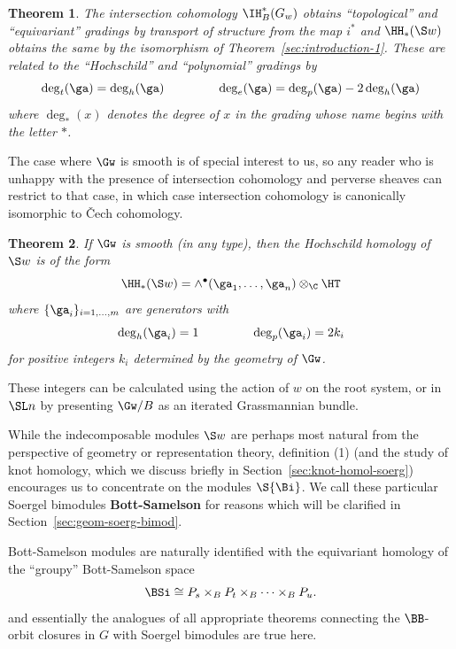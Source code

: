 \documentclass[12pt]{wart}
\newtheorem{thm}{Theorem}[section]
\theoremstyle{remark}
\begin{document}
\begin{thm}\label{grading-match}
  The intersection cohomology $\IH^*_B(G_w)$ obtains ``topological''
  and ``equivariant'' gradings by transport of structure from the map
  $i^*$ and $\HH_*(\S w)$ obtains the same by the isomorphism of
  Theorem~\ref{sec:introduction-1}.  These are related to the
  ``Hochschild'' and ``polynomial'' gradings by
  \begin{equation*}
    \deg_t(\ga)=\deg_h(\ga) \hspace{15mm} \deg_e(\ga)=\deg_p(\ga)-2\deg_h(\ga)
  \end{equation*}
  where $\deg_*(x)$ denotes the degree of $x$ in the grading whose name begins with the letter $*$.
\end{thm}

The case where $\Gw$ is smooth is of special interest to us, so any
reader who is unhappy with the presence of intersection cohomology and
perverse sheaves can restrict to that case, in which case intersection
cohomology is canonically isomorphic to \v{C}ech cohomology.

\begin{thm}\label{ind-HH}
  If $\Gw$ is smooth (in any type), then the Hochschild homology of
  $\S w$ is of the form
  \begin{equation*}
    \HH_*(\S w)=\land^\bullet(\ga_1,\ldots, \ga_n)\otimes_{\C}\HT
  \end{equation*}
  where $\{\ga_i\}_{i=1,\ldots,m}$ are generators with
  \begin{equation*}
    \deg_h(\ga_i)=1\hspace{15mm}\deg_p(\ga_i)=2k_i
  \end{equation*}
  for positive integers $k_i$ determined by the geometry of $\Gw$.
\end{thm}
These integers can be calculated using the action of $w$ on the root
system, or in $\SL n$ by presenting $\Gw/B$ as an iterated Grassmannian bundle.

While the indecomposable modules $\S w$ are perhaps most natural from
the perspective of geometry or representation theory, definition (1)
(and the study of knot homology, which we discuss briefly in
Section~\ref{sec:knot-homol-soerg}) encourages us to concentrate on
the modules $ \S{\Bi}$.  We call these particular Soergel bimodules
{\bf Bott-Samelson} for reasons which will be clarified in
Section~\ref{sec:geom-soerg-bimod}.

Bott-Samelson modules are naturally identified with the equivariant homology of the ``groupy'' Bott-Samelson space
\begin{equation*}
  \BSi\cong P_{s}\times_{B} P_{t} \times_{B} \cdots\times_{B}P_{u}.
\end{equation*}
and essentially the analogues of all appropriate theorems connecting the $\BB$-orbit closures in $G$ with Soergel bimodules are true here.
\end{document}
